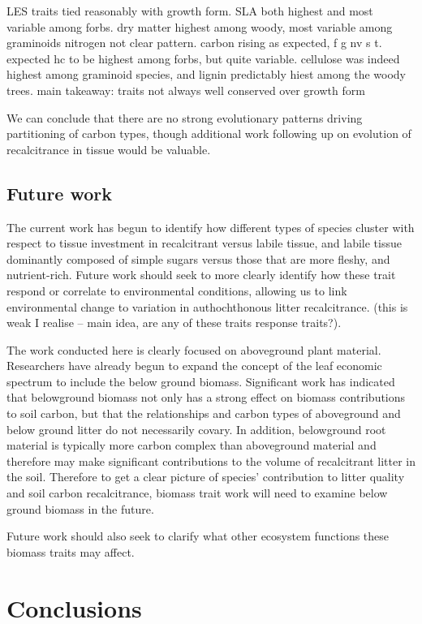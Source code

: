 \documentclass{article}
\begin{document}
LES traits tied reasonably with growth form. 
SLA both highest and most variable among forbs.
dry matter highest among woody, most variable among graminoids
nitrogen not clear pattern. 
carbon rising as expected, f g nv s t. 
expected hc to be highest among forbs, but quite variable. 
cellulose was indeed highest among graminoid species, and lignin predictably hiest among the woody trees. 
main takeaway: traits not always well conserved over growth form 


We can conclude that there are no strong evolutionary patterns driving partitioning of carbon types, though additional work following up on evolution of recalcitrance in tissue would be valuable. 

\subsection{Future work}

The current work has begun to identify how different types of species cluster with respect to tissue investment in recalcitrant versus labile tissue, and labile tissue dominantly composed of simple sugars versus those that are more fleshy, and nutrient-rich. Future work should seek to more clearly identify how these trait respond or correlate to environmental conditions, allowing us to link environmental change to variation in authochthonous litter recalcitrance. (this is weak I realise -- main idea, are any of these traits response traits?).

The work conducted here is clearly focused on aboveground plant material. Researchers have already begun to expand the concept of the leaf economic spectrum to include the below ground biomass. Significant work has indicated that belowground biomass not only has a strong effect on biomass contributions to soil carbon, but that the relationships and carbon types of aboveground and below ground litter do not necessarily covary. In addition, belowground root material is typically more carbon complex than aboveground material and therefore may make significant contributions to the volume of recalcitrant litter in the soil. Therefore to get a clear picture of species' contribution to litter quality and soil carbon recalcitrance, biomass trait work will need to examine below ground biomass in the future. 

Future work should also seek to clarify what other ecosystem functions these biomass traits may affect. 

\section{Conclusions}
\end{document}
